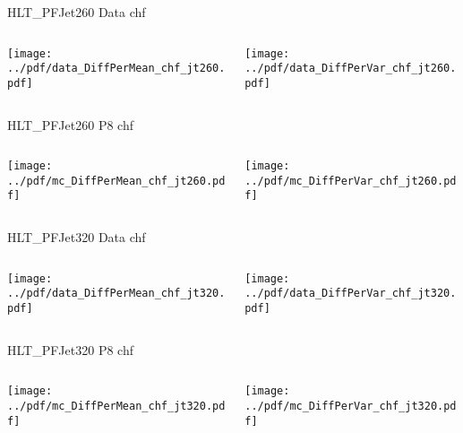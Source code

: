 \documentclass[9pt]{beamer}
\begin{document}
\begin{frame}[t]{HLT\_PFJet260 Data chf}
\begin{columns}[T]
  \begin{column}{.5\textwidth}
  \texttt{[image: ../pdf/data\_DiffPerMean\_chf\_jt260.pdf]}
  \end{column}
  \begin{column}{.5\textwidth}
  \texttt{[image: ../pdf/data\_DiffPerVar\_chf\_jt260.pdf]}
  \end{column}
\end{columns}
\end{frame}

\begin{frame}[t]{HLT\_PFJet260 P8 chf}
\begin{columns}[T]
  \begin{column}{.5\textwidth}
  \texttt{[image: ../pdf/mc\_DiffPerMean\_chf\_jt260.pdf]}
  \end{column}
  \begin{column}{.5\textwidth}
  \texttt{[image: ../pdf/mc\_DiffPerVar\_chf\_jt260.pdf]}
  \end{column}
\end{columns}
\end{frame}

\begin{frame}[t]{HLT\_PFJet320 Data chf}
\begin{columns}[T]
  \begin{column}{.5\textwidth}
  \texttt{[image: ../pdf/data\_DiffPerMean\_chf\_jt320.pdf]}
  \end{column}
  \begin{column}{.5\textwidth}
  \texttt{[image: ../pdf/data\_DiffPerVar\_chf\_jt320.pdf]}
  \end{column}
\end{columns}
\end{frame}

\begin{frame}[t]{HLT\_PFJet320 P8 chf}
\begin{columns}[T]
  \begin{column}{.5\textwidth}
  \texttt{[image: ../pdf/mc\_DiffPerMean\_chf\_jt320.pdf]}
  \end{column}
  \begin{column}{.5\textwidth}
  \texttt{[image: ../pdf/mc\_DiffPerVar\_chf\_jt320.pdf]}
  \end{column}
\end{columns}
\end{frame}
\end{document}

